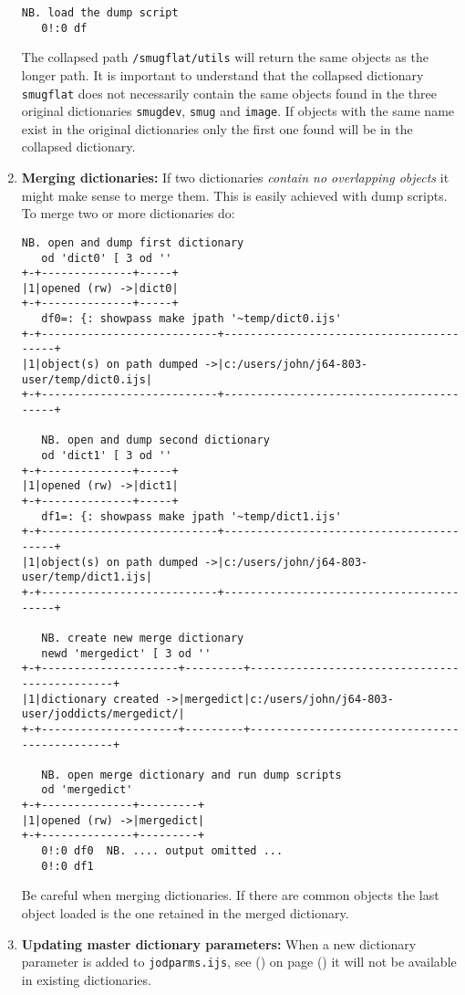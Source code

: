 \begin{enumerate}
\begin{lstlisting}[frame=single,framerule=0pt,basicstyle=\ttfamily\footnotesize]
   NB. load the dump script 
   0!:0 df
\end{lstlisting}

The collapsed path \texttt{/smugflat/utils} will return the same objects as the longer path.
It is important to understand that the collapsed dictionary \texttt{smugflat} does not necessarily contain
the same objects found in the three original dictionaries \texttt{smugdev}, \texttt{smug} and \texttt{image}.
If objects with the same name exist in the original dictionaries only the first one found will 
be in the collapsed dictionary.


\item \textbf{Merging dictionaries:} If two dictionaries \emph{contain no overlapping objects} it might make
sense to merge them. This is easily achieved with dump scripts. To merge two or more dictionaries do:

\begin{lstlisting}[frame=single,framerule=0pt,basicstyle=\ttfamily\footnotesize]
   NB. open and dump first dictionary
   od 'dict0' [ 3 od ''
+-+--------------+-----+
|1|opened (rw) ->|dict0|
+-+--------------+-----+
   df0=: {: showpass make jpath '~temp/dict0.ijs'
+-+---------------------------+-----------------------------------------+
|1|object(s) on path dumped ->|c:/users/john/j64-803-user/temp/dict0.ijs|
+-+---------------------------+-----------------------------------------+
   
   NB. open and dump second dictionary
   od 'dict1' [ 3 od ''
+-+--------------+-----+
|1|opened (rw) ->|dict1|
+-+--------------+-----+
   df1=: {: showpass make jpath '~temp/dict1.ijs'
+-+---------------------------+-----------------------------------------+
|1|object(s) on path dumped ->|c:/users/john/j64-803-user/temp/dict1.ijs|
+-+---------------------------+-----------------------------------------+
   
   NB. create new merge dictionary
   newd 'mergedict' [ 3 od ''
+-+---------------------+---------+----------------------------------------------+
|1|dictionary created ->|mergedict|c:/users/john/j64-803-user/joddicts/mergedict/|
+-+---------------------+---------+----------------------------------------------+
   
   NB. open merge dictionary and run dump scripts
   od 'mergedict'
+-+--------------+---------+
|1|opened (rw) ->|mergedict|
+-+--------------+---------+
   0!:0 df0  NB. .... output omitted ... 
   0!:0 df1
\end{lstlisting}

Be careful when merging dictionaries. If there are common objects the last object loaded is the one
retained in the merged dictionary.



\item \textbf{Updating master dictionary parameters:} When a new dictionary parameter is added to \texttt{jodparms.ijs}, 
see () on page () it will not be available in existing dictionaries.
\end{enumerate} 

